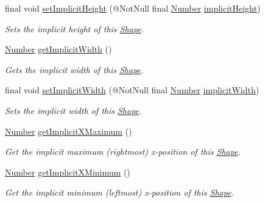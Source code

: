 \begin{DoxyCompactItemize}
final void \hyperlink{classcom_1_1aarrelaakso_1_1drawl_1_1_shape_a608e72be0fb16380e5fda14564c46739}{set\+Implicit\+Height} (@Not\+Null final \hyperlink{interfacecom_1_1aarrelaakso_1_1drawl_1_1_number}{Number} \hyperlink{classcom_1_1aarrelaakso_1_1drawl_1_1_shape_a9270317569c41e7f3f3fbe6e71df86e6}{implicit\+Height})
\begin{DoxyCompactList}\small\item\em Sets the implicit height of this \hyperlink{classcom_1_1aarrelaakso_1_1drawl_1_1_shape}{Shape}. \end{DoxyCompactList}\item 
\hyperlink{interfacecom_1_1aarrelaakso_1_1drawl_1_1_number}{Number} \hyperlink{classcom_1_1aarrelaakso_1_1drawl_1_1_shape_af8182545b3b1c85ecaee849474f63c6b}{get\+Implicit\+Width} ()
\begin{DoxyCompactList}\small\item\em Gets the implicit width of this \hyperlink{classcom_1_1aarrelaakso_1_1drawl_1_1_shape}{Shape}. \end{DoxyCompactList}\item 
final void \hyperlink{classcom_1_1aarrelaakso_1_1drawl_1_1_shape_acc3e365064b5d4f719ac920a5a70aedb}{set\+Implicit\+Width} (@Not\+Null final \hyperlink{interfacecom_1_1aarrelaakso_1_1drawl_1_1_number}{Number} \hyperlink{classcom_1_1aarrelaakso_1_1drawl_1_1_shape_a06c9063aa0b51139910e23414428c9d6}{implicit\+Width})
\begin{DoxyCompactList}\small\item\em Sets the implicit width of this \hyperlink{classcom_1_1aarrelaakso_1_1drawl_1_1_shape}{Shape}. \end{DoxyCompactList}\item 
\hyperlink{interfacecom_1_1aarrelaakso_1_1drawl_1_1_number}{Number} \hyperlink{classcom_1_1aarrelaakso_1_1drawl_1_1_shape_a0903079fd35e3cfdd6cdc299548a9680}{get\+Implicit\+X\+Maximum} ()
\begin{DoxyCompactList}\small\item\em Get the implicit maximum (rightmost) x-\/position of this \hyperlink{classcom_1_1aarrelaakso_1_1drawl_1_1_shape}{Shape}. \end{DoxyCompactList}\item 
\hyperlink{interfacecom_1_1aarrelaakso_1_1drawl_1_1_number}{Number} \hyperlink{classcom_1_1aarrelaakso_1_1drawl_1_1_shape_a264da8a94218b09267c2e177ff0b0951}{get\+Implicit\+X\+Minimum} ()
\begin{DoxyCompactList}\small\item\em Get the implicit minimum (leftmost) x-\/position of this \hyperlink{classcom_1_1aarrelaakso_1_1drawl_1_1_shape}{Shape}. \end{DoxyCompactList}\item 

\end{DoxyCompactItemize}
